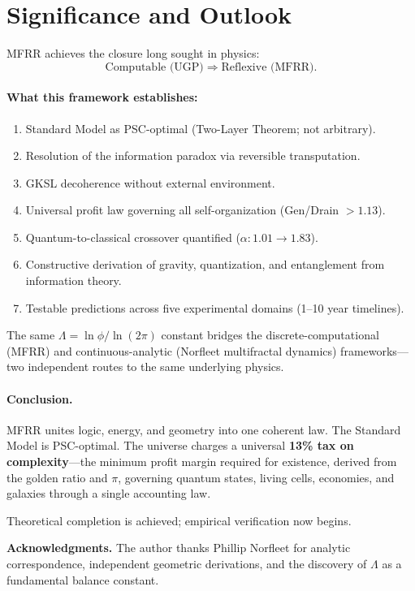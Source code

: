 \documentclass[11pt]{article}
\begin{document}
\section{Significance and Outlook}

MFRR achieves the closure long sought in physics:
\[
\text{Computable (UGP)} \Rightarrow \text{Reflexive (MFRR)}.
\]

\paragraph{What this framework establishes:}
\begin{enumerate}[nosep]
\item Standard Model as PSC-optimal (Two-Layer Theorem; not arbitrary).
\item Resolution of the information paradox via reversible transputation.
\item GKSL decoherence without external environment.
\item Universal profit law governing all self-organization (Gen/Drain $>1.13$).
\item Quantum-to-classical crossover quantified ($\alpha:1.01\to1.83$).
\item Constructive derivation of gravity, quantization, and entanglement from information theory.
\item Testable predictions across five experimental domains (1--10 year timelines).
\end{enumerate}

The same $\Lambda=\ln\phi/\ln(2\pi)$ constant bridges the discrete-computational (MFRR) and continuous-analytic (Norfleet multifractal dynamics) frameworks---two independent routes to the same underlying physics.

\paragraph{Conclusion.}
MFRR unites logic, energy, and geometry into one coherent law. The Standard Model is PSC-optimal. The universe charges a universal \textbf{13\% tax on complexity}---the minimum profit margin required for existence, derived from the golden ratio and $\pi$, governing quantum states, living cells, economies, and galaxies through a single accounting law.

Theoretical completion is achieved; empirical verification now begins.

\vspace{1em}
\noindent\textbf{Acknowledgments.}
The author thanks Phillip Norfleet for analytic correspondence, independent geometric derivations, and the discovery of $\Lambda$ as a fundamental balance constant.
\end{document}
